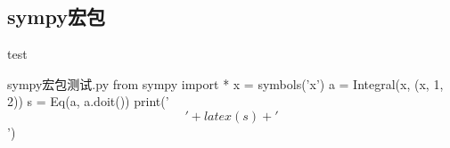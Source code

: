 \documentclass[11pt,oneside]{book}
\begin{document}
\begin{common-format}
\chapter{sympy宏包}
test
\begin{mdframed}
\begin{xverbatim}[129]{sympy宏包测试.py}
from sympy import *
x = symbols('x')
a = Integral(x, (x, 1, 2))
s = Eq(a, a.doit())
print('$$'+ latex(s) + '$$')
\end{xverbatim}
\end{mdframed}































































\end{common-format}
\end{document}

